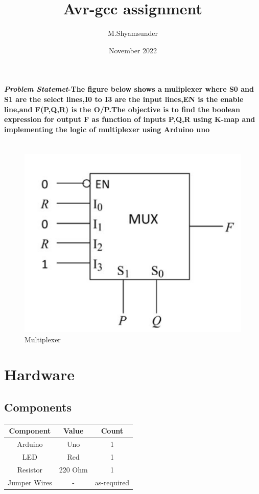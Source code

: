 \documentclass[journal,10pt,twocolumn]{article}
\title{\textbf{Avr-gcc assignment}}
\author{M.Shyamsunder}
\date{November 2022}
\begin{document}
\maketitle
\paragraph{\textit{Problem Statemet}-The figure below shows a muliplexer where S0 and S1 are the select lines,I0 to I3 are the input lines,EN is the enable line,and F(P,Q,R) is the O/P.The objective is to find the boolean expression for output F as function of inputs P,Q,R using K-map and implementing the logic of multiplexer using Arduino uno}

\section*{\normalsize}
\begin{figure}[ht]
\centering
\includegraphics[width=1\columnwidth]{mux.png}
\caption{Multiplexer}
\label{fig:mux}
\end{figure}


\section*{\large Hardware}
\subsection*{\normalsize Components}
{
\centering
\begin{tabular}{|c|c|c|}
\hline
Component&Value&Count\\
\hline
Arduino&Uno&1\\
\hline
LED&Red&1\\
\hline
Resistor&220 Ohm&1\\
\hline
Jumper Wires&-&as-required\\
\hline
\end{tabular}\par
}
\end{document}
